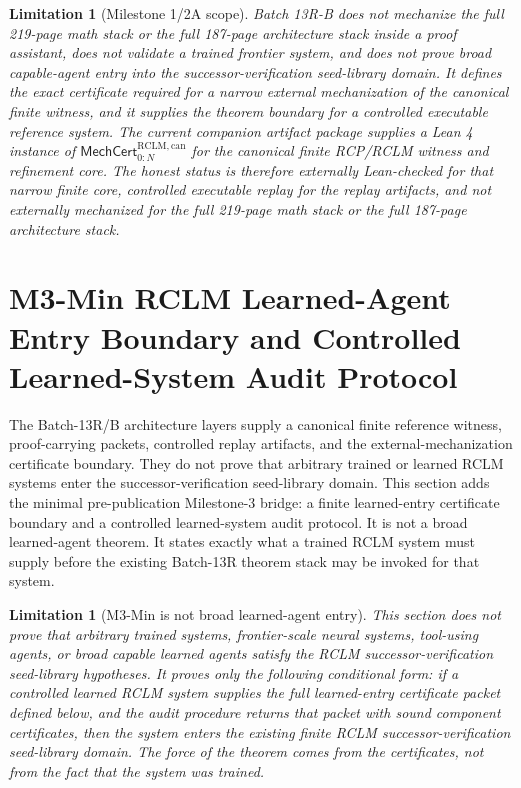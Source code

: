 \documentclass[11pt,a4paper]{article}
\newtheorem{limitation}[theorem]{Limitation}
\newcommand{\RCLM}{\mathrm{RCLM}}
\begin{document}
\begin{limitation}[Milestone 1/2A scope]
\label{lim:rclm-batch13rB-milestone-scope}
Batch 13R-B does not mechanize the full 219-page math stack or the full 187-page architecture stack inside a proof assistant, does not validate a trained frontier system, and does not prove broad capable-agent entry into the successor-verification seed-library domain.  It defines the exact certificate required for a narrow external mechanization of the canonical finite witness, and it supplies the theorem boundary for a controlled executable reference system.  The current companion artifact package supplies a Lean 4 instance of \(\mathsf{MechCert}_{0:N}^{\RCLM,\mathrm{can}}\) for the canonical finite RCP/RCLM witness and refinement core.  The honest status is therefore externally Lean-checked for that narrow finite core, controlled executable replay for the replay artifacts, and not externally mechanized for the full 219-page math stack or the full 187-page architecture stack.
\end{limitation}


\section{M3-Min RCLM Learned-Agent Entry Boundary and Controlled Learned-System Audit Protocol}
\label{sec:rclm-m3min-learned-entry-boundary}

The Batch-13R/B architecture layers supply a canonical finite reference witness, proof-carrying packets, controlled replay artifacts, and the external-mechanization certificate boundary.  They do not prove that arbitrary trained or learned RCLM systems enter the successor-verification seed-library domain.  This section adds the minimal pre-publication Milestone-3 bridge: a finite learned-entry certificate boundary and a controlled learned-system audit protocol.  It is not a broad learned-agent theorem.  It states exactly what a trained RCLM system must supply before the existing Batch-13R theorem stack may be invoked for that system.

\begin{limitation}[M3-Min is not broad learned-agent entry]
\label{lim:rclm-m3min-not-broad-entry}
This section does not prove that arbitrary trained systems, frontier-scale neural systems, tool-using agents, or broad capable learned agents satisfy the RCLM successor-verification seed-library hypotheses.  It proves only the following conditional form: if a controlled learned RCLM system supplies the full learned-entry certificate packet defined below, and the audit procedure returns that packet with sound component certificates, then the system enters the existing finite RCLM successor-verification seed-library domain.  The force of the theorem comes from the certificates, not from the fact that the system was trained.
\end{limitation}
\end{document}
